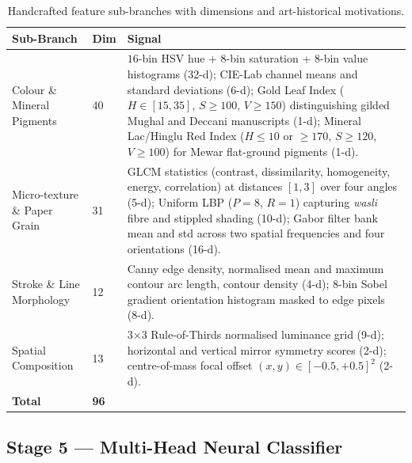 \documentclass[12pt, a4paper, twoside]{article}
\begin{document}
\begin{table}[H]
  \centering
  \caption{Handcrafted feature sub-branches with dimensions and art-historical motivations.}
  \label{tab:features}
  \begin{tabularx}{\linewidth}{L{2.8cm} C{0.8cm} X}
    \toprule
    \textbf{Sub-Branch} & \textbf{Dim} & \textbf{Signal}\\
    \midrule
    Colour \& Mineral Pigments &
      40 &
      $16$-bin HSV hue + $8$-bin saturation + $8$-bin value histograms (32-d); CIE-Lab channel means and standard deviations (6-d); Gold Leaf Index ($H \in [15,35]$, $S \geq 100$, $V \geq 150$) distinguishing gilded Mughal and Deccani manuscripts (1-d); Mineral Lac/Hinglu Red Index ($H \leq 10$ or $\geq 170$, $S \geq 120$, $V \geq 100$) for Mewar flat-ground pigments (1-d).\\
    \midrule
    Micro-texture \& Paper Grain &
      31 &
      GLCM statistics (contrast, dissimilarity, homogeneity, energy, correlation) at distances $[1,3]$ over four angles (5-d); Uniform LBP ($P=8$, $R=1$) capturing \textit{wasli} fibre and stippled shading (10-d); Gabor filter bank mean and std across two spatial frequencies and four orientations (16-d).\\
    \midrule
    Stroke \& Line Morphology &
      12 &
      Canny edge density, normalised mean and maximum contour arc length, contour density (4-d); 8-bin Sobel gradient orientation histogram masked to edge pixels (8-d).\\
    \midrule
    Spatial Composition &
      13 &
      3$\times$3 Rule-of-Thirds normalised luminance grid (9-d); horizontal and vertical mirror symmetry scores (2-d); centre-of-mass focal offset $(x, y) \in [-0.5, +0.5]^2$ (2-d).\\
    \midrule
    \textbf{Total} & \textbf{96} & \\
    \bottomrule
  \end{tabularx}
\end{table}

\subsection{Stage 5 — Multi-Head Neural Classifier}
\end{document}
